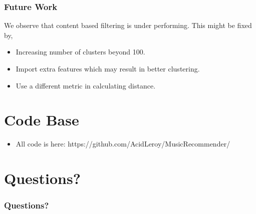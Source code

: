 \documentclass[11pt]{beamer}
\begin{document}
  \begin{frame}
    \frametitle{Future Work}
    We observe that content based filtering is under performing. This might be fixed by,
    \begin{itemize}
      \item Increasing number of clusters beyond 100.
      \item Import extra features which may result in better clustering.
      \item Use a different metric in calculating distance.
    \end{itemize}
  \end{frame}

  \section{Code Base}
  \begin{frame}
    \begin{itemize}
      \item All code is here: https://github.com/AcidLeroy/MusicRecommender/
    \end{itemize}
  \end{frame}

  \section{Questions?}
  \begin{frame}
    \frametitle{Questions?}
  \end{frame}


  
\end{document}
